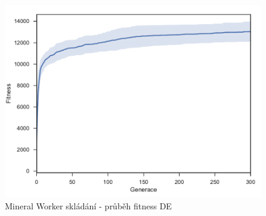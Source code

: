 \clearpage
\begin{figure}[h]\centering
	\includegraphics[width=\columnwidth]{../img/MineralMap/MineralWorkerPickup}
	\caption{Mineral Worker skládání -  průběh fitness DE}
	\label{obr04:MineralWorkerStore}
\end{figure}
\par
